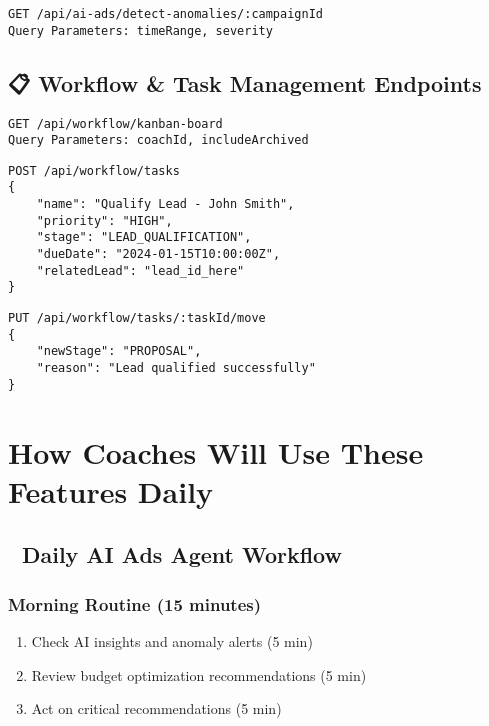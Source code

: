 \documentclass[12pt,a4paper]{article}
\begin{document}
\begin{lstlisting}[caption=Detect Performance Anomalies]
GET /api/ai-ads/detect-anomalies/:campaignId
Query Parameters: timeRange, severity
\end{lstlisting}

\subsection{📋 Workflow \& Task Management Endpoints}

\begin{lstlisting}[caption=Get Kanban Board Data]
GET /api/workflow/kanban-board
Query Parameters: coachId, includeArchived
\end{lstlisting}

\begin{lstlisting}[caption=Create New Task]
POST /api/workflow/tasks
{
    "name": "Qualify Lead - John Smith",
    "priority": "HIGH",
    "stage": "LEAD_QUALIFICATION",
    "dueDate": "2024-01-15T10:00:00Z",
    "relatedLead": "lead_id_here"
}
\end{lstlisting}

\begin{lstlisting}[caption=Move Task Between Stages]
PUT /api/workflow/tasks/:taskId/move
{
    "newStage": "PROPOSAL",
    "reason": "Lead qualified successfully"
}
\end{lstlisting}

\section{How Coaches Will Use These Features Daily}

\subsection{🤖 Daily AI Ads Agent Workflow}

\subsubsection{Morning Routine (15 minutes)}
\begin{enumerate}
    \item Check AI insights and anomaly alerts (5 min)
    \item Review budget optimization recommendations (5 min)
    \item Act on critical recommendations (5 min)
\end{enumerate}
\end{document}
